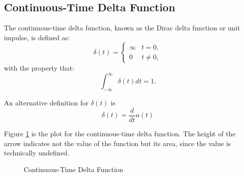 \subsection{Continuous-Time Delta Function}
The continuous-time delta function, known as the Dirac delta 
function or unit impulse, is defined as:
\[
\delta(t) = \begin{cases} 
\infty & t = 0, \\
0 & t \neq 0, 
\end{cases}
\]
with the property that:
\[
\int_{-\infty}^{\infty} \delta(t) dt = 1.
\]

An alternative definition for $\delta(t)$ is 
\begin{equation}
    \delta(t) = \frac{d}{dt} u(t)
\end{equation}

Figure \ref{fig:ct delta} is the plot for the continuous-time delta function. 
The height of the arrow indicates not the value of the function but its area, 
since the value is technically undefined. 

\begin{figure}[h!]
\centering
{}
\caption{Continuous-Time Delta Function}
\label{fig:ct delta}
\end{figure}